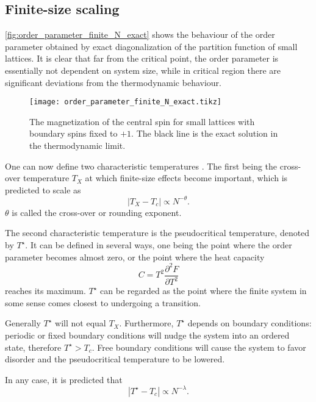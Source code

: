\subsection{Finite-size scaling}\label{sec:finite_size_scaling}

\autoref{fig:order_parameter_finite_N_exact} shows the behaviour of the order parameter obtained by exact
diagonalization of the partition function of small lattices.
It is clear that far from the critical point, the order parameter is essentially not dependent on system size,
while in critical region there are significant deviations from the thermodynamic behaviour.

\begin{figure}
  \texttt{[image: order\_parameter\_finite\_N\_exact.tikz]}
  \caption{The magnetization of the central spin for small lattices with boundary spins fixed to
  $+1$. The black line is the exact solution in the thermodynamic limit.}\label{fig:order_parameter_finite_N_exact}
\end{figure}

One can now define two characteristic temperatures \cite{fisher1967interfacial,
barber1983finite}.
The first being the cross-over temperature $T_X$ at which finite-size effects become important,
which is predicted to scale as
\begin{equation}\label{eq:cross_over_temperature_scaling}
  |T_X - T_c| \propto N^{-\theta}.
\end{equation}
$\theta$ is called the cross-over or rounding exponent.

The second characteristic temperature is the pseudocritical temperature,
denoted by $T^{\star}$.
It can be defined in several ways, one being the point where the order parameter becomes almost zero,
or the point where the heat capacity
\begin{equation}
  C = T^2 \frac{\partial^2 F}{\partial T^2}
\end{equation}
reaches its maximum.
$T^{\star}$ can be regarded as the point where the finite system in some sense comes closest to undergoing a transition.

Generally $T^{\star}$ will not equal $T_X$. Furthermore, $T^{\star}$ depends on boundary conditions:
periodic or fixed boundary conditions will nudge the system into an ordered state,
therefore $T^{\star} > T_c$.
Free boundary conditions will cause the system to favor disorder and the pseudocritical temperature to be lowered.

In any case, it is predicted that
\begin{equation}\label{eq:scaling_law_T_star}
  |T^{\star} - T_c| \propto N^{-\lambda}.
\end{equation}

